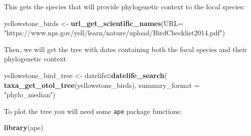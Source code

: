 \documentclass[]{article}
\newenvironment{Shaded}{\begin{snugshade}}{\end{snugshade}}
\newcommand{\DataTypeTok}[1]{\textcolor[rgb]{0.13,0.29,0.53}{#1}}
\newcommand{\FloatTok}[1]{\textcolor[rgb]{0.00,0.00,0.81}{#1}}
\newcommand{\KeywordTok}[1]{\textcolor[rgb]{0.13,0.29,0.53}{\textbf{#1}}}
\newcommand{\NormalTok}[1]{#1}
\newcommand{\OperatorTok}[1]{\textcolor[rgb]{0.81,0.36,0.00}{\textbf{#1}}}
\newcommand{\OtherTok}[1]{\textcolor[rgb]{0.56,0.35,0.01}{#1}}
\newcommand{\StringTok}[1]{\textcolor[rgb]{0.31,0.60,0.02}{#1}}
\begin{document}
This gets the species that will provide phylogenetic context to the focal species:

\begin{Shaded}
\begin{Highlighting}[]
\NormalTok{yellowstone_birds <-}\StringTok{ }\KeywordTok{url_get_scientific_names}\NormalTok{(}\DataTypeTok{URL=}
    \StringTok{"https://www.nps.gov/yell/learn/nature/upload/BirdChecklist2014.pdf"}\NormalTok{)}
\end{Highlighting}
\end{Shaded}

Then, we will get the tree with dates containing both the focal species and their phylogenetic context

\begin{Shaded}
\begin{Highlighting}[]
\NormalTok{yellowstone_bird_tree <-}\StringTok{ }\NormalTok{datelife}\OperatorTok{::}\KeywordTok{datelife_search}\NormalTok{(}
    \KeywordTok{taxa_get_otol_tree}\NormalTok{(yellowstone_birds), summary_format }
\NormalTok{    =}\StringTok{ "phylo_median"}\NormalTok{)}
\end{Highlighting}
\end{Shaded}

To plot the tree you will need some \texttt{ape} package functions:

\begin{Shaded}
\begin{Highlighting}[]
\KeywordTok{library}\NormalTok{(ape)}
\end{Highlighting}
\end{Shaded}

\begin{Shaded}
\end{Shaded}
\end{document}
